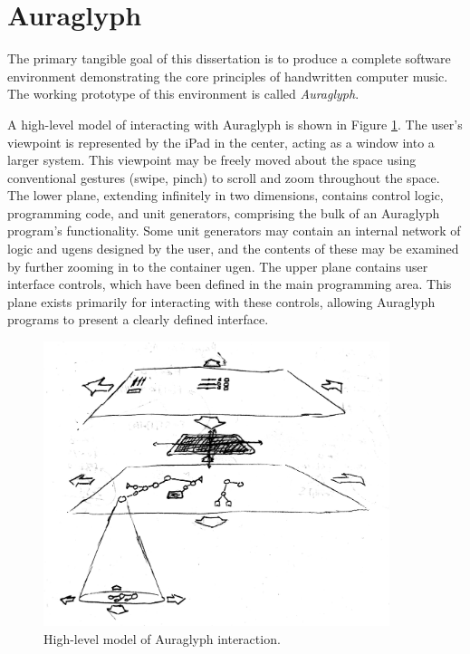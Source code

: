 \documentclass[10pt,letterpaper]{article}
\begin{document}
\section{Auraglyph}
\label{sec:Auraglyph}

The primary tangible goal of this dissertation is to produce a complete software environment demonstrating the core principles of handwritten computer music. 
The working prototype of this environment is called \emph{Auraglyph}. 

A high-level model of interacting with Auraglyph is shown in Figure \ref{fig:auraglyphSystem}. 
The user's viewpoint is represented by the iPad in the center, acting as a window into a larger system. 
This viewpoint may be freely moved about the space using conventional gestures (swipe, pinch) to scroll and zoom throughout the space. 
The lower plane, extending infinitely in two dimensions, contains control logic, programming code, and unit generators, comprising the bulk of an Auraglyph program's functionality.
Some unit generators may contain an internal network of logic and ugens designed by the user, and the contents of these may be examined by further zooming in to the container ugen.  
The upper plane contains user interface controls, which have been defined in the main programming area. 
This plane exists primarily for interacting with these controls, allowing Auraglyph programs to present a clearly defined interface. 


\begin{figure}[h!]
	\centering
		\includegraphics[width=0.9\textwidth]{figures/HWCM-model.jpeg}
	\caption{High-level model of Auraglyph interaction. }
	\label{fig:auraglyphSystem}
\end{figure}
\end{document}
